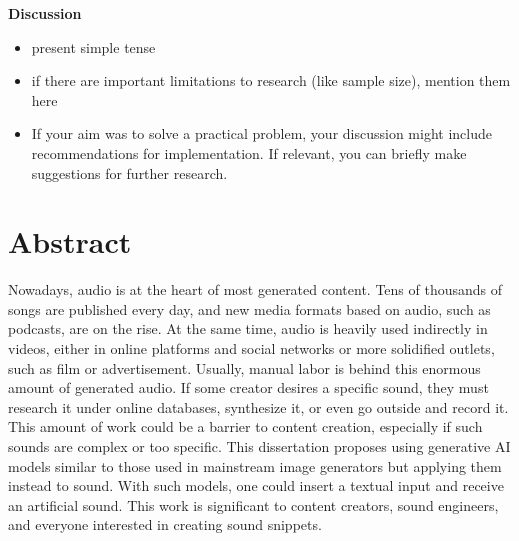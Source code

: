 \textbf{Discussion}

\begin{itemize}
    \item present simple tense
    \item if there are important limitations to research (like sample size), mention them here
    \item If your aim was to solve a practical problem, your discussion might include recommendations for implementation. If relevant, you can briefly make suggestions for further research.
\end{itemize}

\section*{Abstract}

Nowadays, audio is at the heart of most generated content. Tens of thousands of songs are published every day, and new media formats based on audio, such as podcasts, are on the rise. At the same time, audio is heavily used indirectly in videos, either in online platforms and social networks or more solidified outlets, such as film or advertisement. Usually, manual labor is behind this enormous amount of generated audio. If some creator desires a specific sound, they must research it under online databases, synthesize it, or even go outside and record it. This amount of work could be a barrier to content creation, especially if such sounds are complex or too specific. This dissertation proposes using generative AI models similar to those used in mainstream image generators but applying them instead to sound. With such models, one could insert a textual input and receive an artificial sound. This work is significant to content creators, sound engineers, and everyone interested in creating sound snippets.